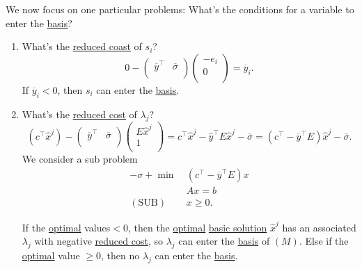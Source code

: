 \begin{prev}
	We now focus on one particular problems: What's the conditions for a variable to enter the \hyperref[def:basic]{basis}?
	\begin{enumerate}
		\item What's the \hyperref[def:reduced-cost]{reduced coast} of \(s_{i}\)?
		      \[
			      0 - \begin{pmatrix}
				      \overline{y}^{\top} & \overline{\sigma} \\
			      \end{pmatrix}\begin{pmatrix}
				      -e_{i} \\
				      0      \\
			      \end{pmatrix} = \overline{y}_i.
		      \]
		      If \(\overline{y}_i<0\), then \(s_{i}\) can enter the \hyperref[def:basic]{basis}.
		\item What's the \hyperref[def:reduced-cost]{reduced cost} of \(\lambda_{j}\)?
		      \[
			      (c^{\top}\hat{x}^j) - \begin{pmatrix}
				      \overline{y}^{\top} & \overline{\sigma} \\
			      \end{pmatrix}\begin{pmatrix}
				      E\hat{x}^j \\
				      1          \\
			      \end{pmatrix} = c^{\top}\hat{x}^j - \hat{y}^{\top}E\hat{x}^j - \overline{\sigma} = (c^{\top} - \overline{y}^{\top}E)\hat{x}^j - \overline{\sigma}.
		      \]
		      We consider a sub problem
		      \begin{align*}
			      -\sigma + \min~     & (c^{\top} - \overline{y}^{\top}E)x \\
			                          & Ax = b                             \\
			      (\mathrm{SUB})\quad & x\geq 0.
		      \end{align*}

		      If the \hyperref[def:optimal-solution]{optimal} values\(<0\), then the \hyperref[def:optimal-solution]{optimal} \hyperref[def:basic-solution]{basic solution}
		      \(\hat{x}^j\) has an associated \(\lambda_{j}\) with negative \hyperref[def:reduced-cost]{reduced cost}, so \(\lambda_{j}\) can
		      enter the \hyperref[def:basic]{basis} of \((M)\). Else if the \hyperref[def:optimal-solution]{optimal} value \(\geq 0\), then no \(\lambda_{j}\) can enter the
		      \hyperref[def:basic]{basis}.


\end{enumerate}
\end{prev}
